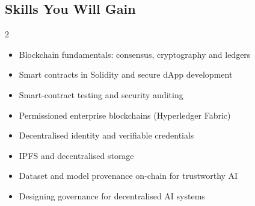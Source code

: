 \documentclass[10pt,a4paper]{article}
\begin{document}
\subsection*{Skills You Will Gain}\begin{multicols}{2}\begin{itemize}\small
\item Blockchain fundamentals: consensus, cryptography and ledgers
\item Smart contracts in Solidity and secure dApp development
\item Smart-contract testing and security auditing
\item Permissioned enterprise blockchains (Hyperledger Fabric)
\item Decentralised identity and verifiable credentials
\item IPFS and decentralised storage
\item Dataset and model provenance on-chain for trustworthy AI
\item Designing governance for decentralised AI systems
\end{itemize}\end{multicols}
\end{document}
